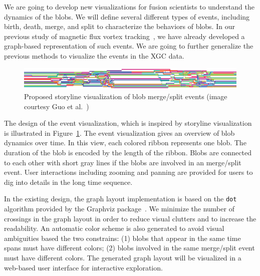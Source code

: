 We are going to develop new visualizations for fusion scientists to understand the dynamics of the blobs.  We will define several different types of events, including birth, death, merge, and split to characterize the behaviors of blobs.  In our previous study of magnetic flux vortex tracking~\cite{GuoPPKG16, GuoPG17, PhillipsGPKG16, PhillipsPKG15}, we have already developed a graph-based representation of such events.  We are going to further generalize the previous methods to visualize the events in the XGC data.  

\begin{figure}[!h]
  \centering
  \includegraphics[width=\linewidth]{Figs/storyline}
  \caption{Proposed storyline visualization of blob merge/split events (image courtesy Guo et al.~\cite{GuoPPKG16})}
  \label{fig:storyline}
\end{figure}

The design of the event visualization, which is inspired by storyline visualization~\cite{TanahashiM12} is illustrated in Figure~\ref{fig:storyline}.  The event visualization gives an overview of blob dynamics over time.  In this view, each colored ribbon represents one blob.  The duration of the blob is encoded by the length of the ribbon.  Blobs are connected to each other with short gray lines if the blobs are involved in an merge/split event.  User interactions including zooming and panning are provided for users to dig into details in the long time sequence.  

In the existing design, the graph layout implementation is based on the \texttt{dot} algorithm provided by the Graphviz package~\cite{GansnerN00}.  We minimize the number of crossings in the graph layout in order to reduce visual clutters and to increase the readability.  An automatic color scheme is also generated to avoid visual ambiguities based the two constrains: (1) blobs that appear in the same time spans must have different colors; (2) blobs involved in the same merge/split event must have different colors.  The generated graph layout will be visualized in a web-based user interface for interactive exploration. 


% 


% 

